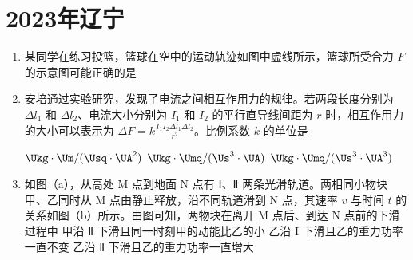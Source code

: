 \documentclass[\gkver]{gaokaozhenti}
\begin{document}
\chapter{2023年辽宁}

\begin{enumerate}
\item
某同学在练习投篮，篮球在空中的运动轨迹如图中虚线所示，篮球所受合力 $F$ 的示意图可能正确的是


\onepicture[w=13cm]{}

\item
安培通过实验研究，发现了电流之间相互作用力的规律。若两段长度分别为 $\Delta l_{1}$ 和 $\Delta l_{2}$、电流大小分别为 $I_{1}$ 和 $I_{2}$ 的平行直导线间距为 $r$ 时，相互作用力的大小可以表示为 $\Delta F = k \frac{{{I_1}{I_2}\Delta {l_1}\Delta {l_2}}}{{{r^2}}}$。比例系数 $k$ 的单位是

\fourchoices[answer=B]
{$\Ukg\cdot\Um/(\Usq\cdot\UA)$}
{$\Ukg\cdot\Um/(\Usq\cdot\UA^{2})$}
{$\Ukg\cdot\Umq/(\Us^{3}\cdot\UA)$}
{$\Ukg\cdot\Umq/(\Us^{3}\cdot\UA^{3})$}

\item
如图（a），从高处 M 点到地面 N 点有 Ⅰ、Ⅱ 两条光滑轨道。两相同小物块甲、乙同时从 M 点由静止释放，沿不同轨道滑到 N 点，其速率 $v$ 与时间 $t$ 的关系如图（b）所示。由图可知，两物块在离开 M 点后、到达 N 点前的下滑过程中
{甲沿 Ⅱ 下滑且同一时刻甲的动能比乙的小}
{乙沿 I 下滑且乙的重力功率一直不变}
{乙沿 Ⅱ 下滑且乙的重力功率一直增大}
\end{enumerate}
\end{document}
